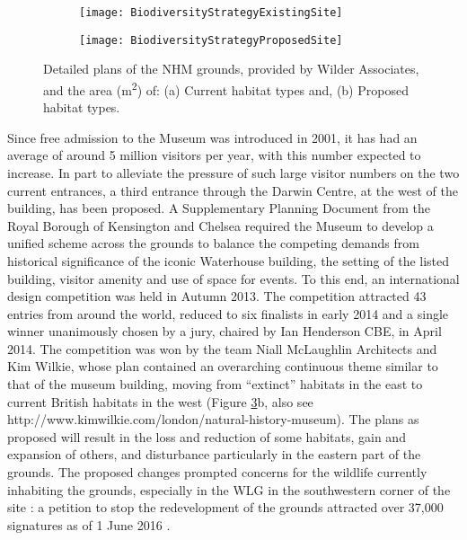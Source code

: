 \begin{figure}
	\centering

	\begin{subfigure}[t]{0.45\textwidth}
		\centering
		\texttt{[image: BiodiversityStrategyExistingSite]}
       		 \caption{}\label{fig:fig_a}
	\end{subfigure}
%
	\begin{subfigure}[t]{0.45\textwidth}
		\centering
		\texttt{[image: BiodiversityStrategyProposedSite]}
		\caption{}\label{fig:fig_b}
	\end{subfigure}
	\caption{Detailed plans of the NHM grounds, provided by Wilder Associates, and the area (m\textsuperscript{2}) of: (a) Current habitat types and, (b) Proposed habitat types.}
	\label{fig:wlgplan_after}
\end{figure}

Since free admission to the Museum was introduced in 2001, it has had an average of around 5 million visitors per year, with this number expected to increase. In part to alleviate the pressure of such large visitor numbers on the two current entrances, a third entrance through the Darwin Centre, at the west of the building, has been proposed. A Supplementary Planning Document from the Royal Borough of Kensington and Chelsea \citep{rbkc:2012} required the Museum to develop a unified scheme across the grounds to balance the competing demands from historical significance of the iconic Waterhouse building, the setting of the listed building, visitor amenity and use of space for events. To this end, an international design competition was held in Autumn 2013. The competition attracted 43 entries from around the world, reduced to six finalists in early 2014 and a single winner unanimously chosen by a jury, chaired by Ian Henderson CBE, in April 2014. The competition was won by the team Niall McLaughlin Architects and Kim Wilkie, whose plan contained an overarching continuous theme similar to that of the museum building, moving from ``extinct'' habitats in the east to current British habitats in the west (Figure \ref{fig:wlgplan_after}b, also see http://www.kimwilkie.com/london/natural-history-museum). The plans as proposed will result in the loss and reduction of some habitats, gain and expansion of others, and disturbance particularly in the eastern part of the grounds. The proposed changes prompted concerns for the wildlife currently inhabiting the grounds, especially in the WLG in the southwestern corner of the site \citep{prospect:2015wg,guardian:2015wg,avery:2015wg,telegraph:2015wg,dailymail:2015wg}: a petition to stop the redevelopment of the grounds attracted over 37,000 signatures as of 1 June 2016 \citep{changepetition:2015wg}.  

